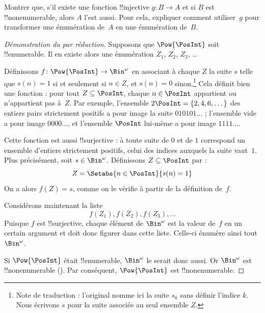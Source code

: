 \documentclass[11pt,a4paper,openany]{memoir}
\begin{document}
\begin{prob}
Montrer que, s'il existe une fonction !!{injective} $g\colon B \to A$
et si $B$ est !!{nonenumerable}, alors $A$ l'est aussi. Pour cela,
expliquer comment utiliser~$g$ pour transformer une énumération de~$A$
en une énumération de~$B$.
\end{prob}

\begin{proof}[Démonstration du {} par réduction]
Supposons que $\Pow{\PosInt}$ soit !!{enumerable}. Il en existe alors
une énumération $Z_{1}$, $Z_{2}$, $Z_{3}$, \dots

Définissons $f \colon \Pow{\PosInt} \to \Bin^\omega$ en associant
à chaque $Z$ la suite $s$ telle que $s(n) = 1$ si et seulement si
$n \in Z$, et $s(n) = 0$ sinon.\footnote{Note de traduction :
l'original nomme ici la suite $s_k$ sans définir l'indice $k$.
Nous écrivons $s$ pour la suite associée au seul ensemble $Z$.}
Cela définit bien une fonction : pour tout $Z \subseteq \PosInt$,
chaque $n \in \PosInt$ appartient ou n'appartient pas à~$Z$.
Par exemple, l'ensemble $2\PosInt = \{2, 4, 6, \dots\}$ des entiers
pairs strictement positifs a pour image la suite $010101\dots$ ;
l'ensemble vide a pour image $0000\dots$, et l'ensemble $\PosInt$
lui-même a pour image $1111\dots$.

Cette fonction est aussi !!{surjective} : à toute suite de $0$ et de
$1$ correspond un ensemble d'entiers strictement positifs, celui des
indices auxquels la suite vaut~$1$. Plus précisément, soit
$s \in \Bin^\omega$. Définissons $Z \subseteq \PosInt$ par :
\[
Z = \Setabs{n \in \PosInt}{s(n) = 1}
\]
On a alors $f(Z) = s$, comme on le vérifie à partir de la définition
de~$f$.

Considérons maintenant la liste
\[
f(Z_1), f(Z_2), f(Z_3), \dots
\]
Puisque $f$ est !!{surjective}, chaque élément de $\Bin^\omega$ est
la valeur de~$f$ en un certain argument et doit donc figurer dans
cette liste. Celle-ci énumère ainsi tout~$\Bin^\omega$.

Si $\Pow{\PosInt}$ était !!{enumerable}, $\Bin^\omega$ le serait
donc aussi. Or $\Bin^\omega$ est !!{nonenumerable}
(). Par conséquent,
$\Pow{\PosInt}$ est !!{nonenumerable}.
\end{proof}
\end{document}
